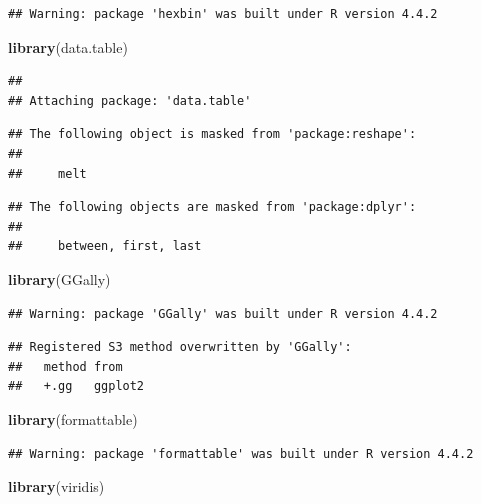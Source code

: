 \documentclass[
]{article}
\newenvironment{Shaded}{\begin{snugshade}}{\end{snugshade}}
\newcommand{\FunctionTok}[1]{\textcolor[rgb]{0.13,0.29,0.53}{\textbf{#1}}}
\newcommand{\NormalTok}[1]{#1}
\begin{document}
\begin{verbatim}
## Warning: package 'hexbin' was built under R version 4.4.2
\end{verbatim}

\begin{Shaded}
\begin{Highlighting}[]
\FunctionTok{library}\NormalTok{(data.table)}
\end{Highlighting}
\end{Shaded}

\begin{verbatim}
## 
## Attaching package: 'data.table'
\end{verbatim}

\begin{verbatim}
## The following object is masked from 'package:reshape':
## 
##     melt
\end{verbatim}

\begin{verbatim}
## The following objects are masked from 'package:dplyr':
## 
##     between, first, last
\end{verbatim}

\begin{Shaded}
\begin{Highlighting}[]
\FunctionTok{library}\NormalTok{(GGally)}
\end{Highlighting}
\end{Shaded}

\begin{verbatim}
## Warning: package 'GGally' was built under R version 4.4.2
\end{verbatim}

\begin{verbatim}
## Registered S3 method overwritten by 'GGally':
##   method from   
##   +.gg   ggplot2
\end{verbatim}

\begin{Shaded}
\begin{Highlighting}[]
\FunctionTok{library}\NormalTok{(formattable)}
\end{Highlighting}
\end{Shaded}

\begin{verbatim}
## Warning: package 'formattable' was built under R version 4.4.2
\end{verbatim}

\begin{Shaded}
\begin{Highlighting}[]
\FunctionTok{library}\NormalTok{(viridis)}
\end{Highlighting}
\end{Shaded}
\end{document}
